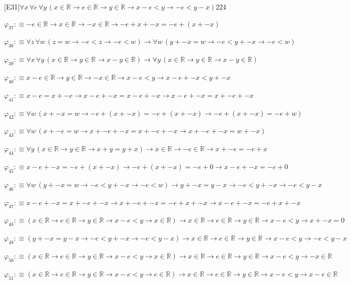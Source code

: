 \begin{fullproof}{[E31]}{$\forall x\,\forall e\,\forall y\,(x \in \mathbb{R} \to e \in \mathbb{R} \to y \in \mathbb{R} \to x - e < y \to -e < y - x)$}{224}
\begin{abbrevlist}
\item $\varphi_{37} :\equiv -e \in \mathbb{R} \to x \in \mathbb{R} \to -x \in \mathbb{R} \to -e + x + -x = -e + (x + -x)$
\item $\varphi_{38} :\equiv \forall z\,\forall w\,(z = w \to -e < z \to -e < w) \to \forall w\,(y + -x = w \to -e < y + -x \to -e < w)$
\item $\varphi_{39} :\equiv \forall x\,\forall y\,(x \in \mathbb{R} \to y \in \mathbb{R} \to x - y \in \mathbb{R}) \to \forall y\,(x \in \mathbb{R} \to y \in \mathbb{R} \to x - y \in \mathbb{R})$
\item $\varphi_{40} :\equiv x - e \in \mathbb{R} \to y \in \mathbb{R} \to -x \in \mathbb{R} \to x - e < y \to x - e + -x < y + -x$
\item $\varphi_{41} :\equiv x - e = x + -e \to x - e + -x = x - e + -x \to x - e + -x = x + -e + -x$
\item $\varphi_{42} :\equiv \forall w\,(x + -x = w \to -e + (x + -x) = -e + (x + -x) \to -e + (x + -x) = -e + w)$
\item $\varphi_{43} :\equiv \forall w\,(x + -e = w \to x + -e + -x = x + -e + -x \to x + -e + -x = w + -x)$
\item $\varphi_{44} :\equiv \forall y\,(x \in \mathbb{R} \to y \in \mathbb{R} \to x + y = y + x) \to x \in \mathbb{R} \to -e \in \mathbb{R} \to x + -e = -e + x$
\item $\varphi_{45} :\equiv x - e + -x = -e + (x + -x) \to -e + (x + -x) = -e + 0 \to x - e + -x = -e + 0$
\item $\varphi_{46} :\equiv \forall w\,(y + -x = w \to -e < y + -x \to -e < w) \to y + -x = y - x \to -e < y + -x \to -e < y - x$
\item $\varphi_{47} :\equiv x - e + -x = x + -e + -x \to x + -e + -x = -e + x + -x \to x - e + -x = -e + x + -x$
\item $\varphi_{48} :\equiv (x \in \mathbb{R} \to e \in \mathbb{R} \to y \in \mathbb{R} \to x - e < y \to x \in \mathbb{R}) \to x \in \mathbb{R} \to e \in \mathbb{R} \to y \in \mathbb{R} \to x - e < y \to x + -x = 0$
\item $\varphi_{49} :\equiv (y + -x = y - x \to -e < y + -x \to -e < y - x) \to x \in \mathbb{R} \to e \in \mathbb{R} \to y \in \mathbb{R} \to x - e < y \to -e < y - x$
\item $\varphi_{50} :\equiv (x \in \mathbb{R} \to e \in \mathbb{R} \to y \in \mathbb{R} \to x - e < y \to x \in \mathbb{R}) \to x \in \mathbb{R} \to e \in \mathbb{R} \to y \in \mathbb{R} \to x - e < y \to -x \in \mathbb{R}$
\item $\varphi_{51} :\equiv (x \in \mathbb{R} \to e \in \mathbb{R} \to y \in \mathbb{R} \to x - e < y \to e \in \mathbb{R}) \to x \in \mathbb{R} \to e \in \mathbb{R} \to y \in \mathbb{R} \to x - e < y \to x - e \in \mathbb{R}$

\end{abbrevlist}
\end{fullproof}
